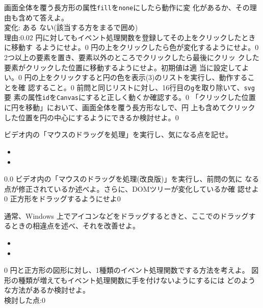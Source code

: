\documentclass[a4j]{jreport}
\begin{document}
{
{\Must 画面全体を覆う長方形の属性\texttt{fill}を\texttt{none}にしたら動作に変
化があるか、その理由も含めて答えよ。\\
変化: ある ない(該当する方をまるで囲め)\\
理由:}{0.02}
{\Must 円に対してもイベント処理関数を登録してその上をクリックしたときに移動す
るようにせよ。}{0}
{\Must 円の上をクリックしたら色が変化するようにせよ。}{0}
{2つ以上の要素を置き、要素以外のところでクリックしたら最後にクリッ
        クした要素がクリックした位置に移動するようにせよ。初期値は適
        当に設定してよい。}{0}
{\Must 円の上をクリックすると円の色を表示(3)のリストを実行し、動作することを確
認すること。}{0}
{前問と同じリストに対し、16行目の\texttt{g}を取り除いて、\texttt{svg}要
素の属性\texttt{id}を\texttt{Canvas}にすると正しく動くか確認する。}{0}
{「クリックした位置に円を移動」において、画面全体を覆う長方形なしで、円
上も含めてクリックした位置を円の中心にするようにできるか検討せよ。}{0}
}
{
{\Must ビデオ内の「マウスのドラッグを処理」を実行し、気になる点を記せ。
\begin{itemize}
 \item \rule{0em}{0.5cm}
 \item \rule{0em}{0.7cm}
\end{itemize}}{0.0}
{\Must ビデオ内の「マウスのドラッグを処理(改良版)」を実行し、前問の気に
なる点が修正されているか述べよ。さらに、DOMツリーが変化しているか確
認せよ}{0}
{\Must 正方形をドラッグするようにせよ}{0}
{通常、Windows 上でアイコンなどをドラッグするときと、ここでのドラッグす
るときの相違点を述べ、それを改善せよ。
\begin{itemize}
 \item \rule{0em}{0.5cm}
 \item \rule{0em}{0.7cm}
\end{itemize}}{0}
{円と正方形の図形に対し、1種類のイベント処理関数でする方法を考えよ。
			 図形の種類が増えてもイベント処理関数に手を付けないようにするには
			 どのような方法があるか検討せよ。\\
       検討した点:}{0}
       }
\end{document}
